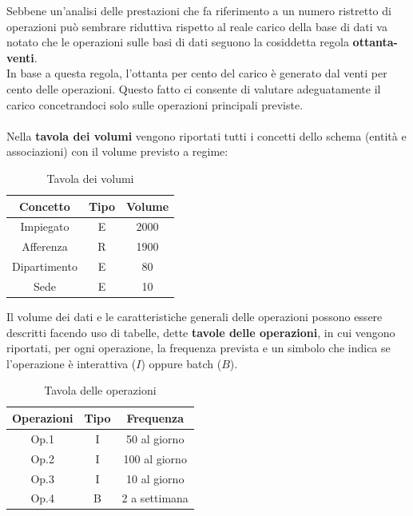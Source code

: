 Sebbene un'analisi delle prestazioni che fa riferimento a un numero ristretto di operazioni può sembrare riduttiva rispetto al reale carico della base di dati va notato che le operazioni sulle basi di dati seguono la cosiddetta regola \textbf{ottanta-venti}.\\
In base a questa regola, l'ottanta per cento del carico è generato dal venti per cento delle operazioni. Questo fatto ci consente di valutare adeguatamente il carico concetrandoci solo sulle operazioni principali previste.\\\\
Nella \textbf{tavola dei volumi} vengono riportati tutti i concetti dello schema (entità e associazioni) con il volume previsto a regime:
    \begin{table}\caption{Tavola dei volumi}
        \begin{center}\begin{tabular}{|c|c|c|} \hline
        \textbf{Concetto} & \textbf{Tipo} & \textbf{Volume} \\ \hline
        Impiegato & E & 2000 \\ \hline
        Afferenza & R & 1900 \\ \hline
        Dipartimento & E & 80 \\ \hline
        Sede & E & 10\\ \hline
        \end{tabular}\end{center}
    \end{table}
Il volume dei dati e le caratteristiche generali delle operazioni possono essere descritti facendo uso di tabelle, dette \textbf{tavole delle operazioni}, in cui vengono riportati, per ogni operazione, la frequenza prevista e un simbolo che indica se l'operazione è interattiva ($I$) oppure batch ($B$).
    \begin{table}\caption{Tavola delle operazioni}
        \begin{center}\begin{tabular}{|c|c|c|} \hline
        \textbf{Operazioni} & \textbf{Tipo} & \textbf{Frequenza} \\ \hline
        Op.1 & I & 50 al giorno \\ \hline
        Op.2 & I & 100 al giorno \\ \hline
        Op.3 & I & 10 al giorno \\ \hline
        Op.4 & B & 2 a settimana\\ \hline
        \end{tabular}\end{center}
    \end{table}
